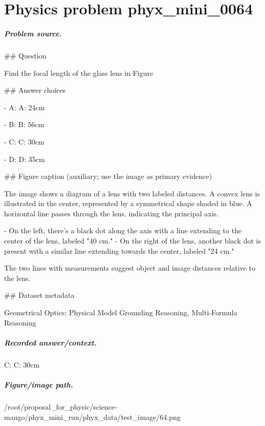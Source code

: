 
\chapter{Physics problem phyx\_mini\_0064}
\label{ch:PhyXMiniProblems_problem_phyx_mini_0064}

\paragraph{Problem source.}
\#\# Question

Find the focal length of the glass lens in Figure

\#\# Answer choices

- A: A: 24cm

- B: B: 56cm

- C: C: 30cm

- D: D: 35cm

\#\# Figure caption (auxiliary; use the image as primary evidence)

The image shows a diagram of a lens with two labeled distances. A convex lens is illustrated in the center, represented by a symmetrical shape shaded in blue. A horizontal line passes through the lens, indicating the principal axis.

- On the left, there's a black dot along the axis with a line extending to the center of the lens, labeled "40 cm."
- On the right of the lens, another black dot is present with a similar line extending towards the center, labeled "24 cm."

The two lines with measurements suggest object and image distances relative to the lens.

\#\# Dataset metadata

Geometrical Optics; Physical Model Grounding Reasoning, Multi-Formula Reasoning

\paragraph{Recorded answer/context.}
C: C: 30cm

\paragraph{Figure/image path.}
/root/proposal\_for\_physic/science-mango/phyx\_mini\_run/phyx\_data/test\_image/64.png


